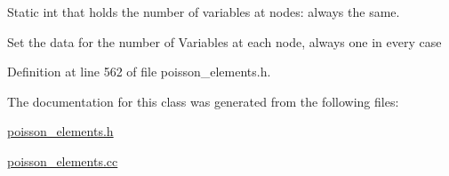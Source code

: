 Static int that holds the number of variables at nodes\+: always the same. 

Set the data for the number of Variables at each node, always one in every case 

Definition at line 562 of file poisson\+\_\+elements.\+h.



The documentation for this class was generated from the following files\+:\begin{DoxyCompactItemize}
\item 
\hyperlink{poisson__elements_8h}{poisson\+\_\+elements.\+h}\item 
\hyperlink{poisson__elements_8cc}{poisson\+\_\+elements.\+cc}\end{DoxyCompactItemize}
